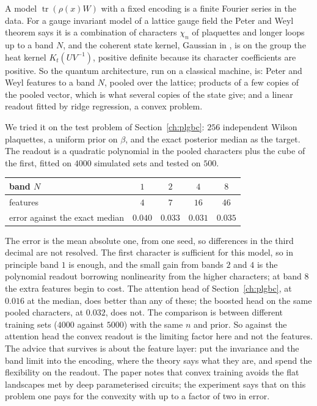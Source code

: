 A model $\operatorname{tr}(\rho(x)W)$ with a fixed encoding is a finite Fourier series in the data. For a gauge invariant model of a lattice gauge field the Peter and Weyl theorem says it is a combination of characters $\chi_n$ of plaquettes and longer loops up to a band $N$, and the coherent state kernel, Gaussian in \cite{PSX23}, is on the group the heat kernel $K_t(UV^{-1})$, positive definite because its character coefficients are positive. So the quantum architecture, run on a classical machine, is: Peter and Weyl features to a band $N$, pooled over the lattice; products of a few copies of the pooled vector, which is what several copies of the state give; and a linear readout fitted by ridge regression, a convex problem.

We tried it on the test problem of Section~\ref{ch:plgbc}: $256$ independent Wilson plaquettes, a uniform prior on $\beta$, and the exact posterior median as the target. The readout is a quadratic polynomial in the pooled characters plus the cube of the first, fitted on $4000$ simulated sets and tested on $500$.

\begin{center}
\small
\begin{tabular}{lcccc}
\toprule
band $N$ & $1$ & $2$ & $4$ & $8$ \\ \midrule
features & $4$ & $7$ & $16$ & $46$ \\
error against the exact median & $0.040$ & $0.033$ & $0.031$ & $0.035$ \\
\bottomrule
\end{tabular}
\end{center}

The error is the mean absolute one, from one seed, so differences in the third decimal are not resolved. The first character is sufficient for this model, so in principle band $1$ is enough, and the small gain from bands $2$ and $4$ is the polynomial readout borrowing nonlinearity from the higher characters; at band $8$ the extra features begin to cost. The attention head of Section~\ref{ch:plgbc}, at $0.016$ at the median, does better than any of these; the boosted head on the same pooled characters, at $0.032$, does not. The comparison is between different training sets ($4000$ against $5000$) with the same $n$ and prior. So against the attention head the convex readout is the limiting factor here and not the features. The advice that survives is about the feature layer: put the invariance and the band limit into the encoding, where the theory says what they are, and spend the flexibility on the readout. The paper notes that convex training avoids the flat landscapes met by deep parameterised circuits; the experiment says that on this problem one pays for the convexity with up to a factor of two in error.


